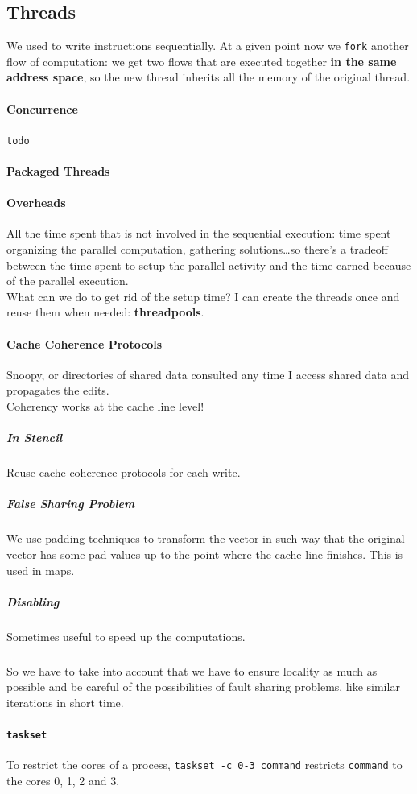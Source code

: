 \documentclass[10pt]{report}
\begin{document}
\subsection{Threads}
We used to write instructions sequentially. At a given point now we \texttt{fork} another flow of computation: we get two flows that are executed together \textbf{in the same address space}, so the new thread inherits all the memory of the original thread.
\paragraph{Concurrence} \texttt{todo} %
\paragraph{Packaged Threads}
\paragraph{Overheads} %
All the time spent that is not involved in the sequential execution: time spent organizing the parallel computation, gathering solutions\ldots so there's a tradeoff between the time spent to setup the parallel activity and the time earned because of the parallel execution.\\
What can we do to get rid of the setup time? I can create the threads once and reuse them when needed: \textbf{threadpools}.
\paragraph{Cache Coherence Protocols} Snoopy, or directories of shared data consulted any time I access shared data and propagates the edits.\\
Coherency works at the cache line level!
\subparagraph{In Stencil} Reuse cache coherence protocols for each write.
\subparagraph{False Sharing Problem} We use padding techniques to transform the vector in such way that the original vector has some pad values up to the point where the cache line finishes. This is used in maps.
\subparagraph{Disabling} Sometimes useful to speed up the computations.
\subparagraph{} So we have to take into account that we have to ensure locality as much as possible and be careful of the possibilities of fault sharing problems, like similar iterations in short time.
\paragraph{\texttt{taskset}} To restrict the cores of a process, \texttt{taskset -c 0-3 command} restricts \texttt{command} to the cores 0, 1, 2 and 3.
\end{document}
